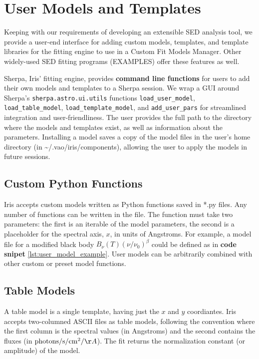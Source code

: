 \section{User Models and Templates}
\label{sec:usermodels}

Keeping with our requirements of developing an extensible SED analysis tool, we provide a user-end interface for adding custom models, templates, and template libraries for the fitting engine to use in a Custom Fit Models Manager. Other widely-used SED fitting programs (EXAMPLES) offer these features as well.

Sherpa, Iris' fitting engine, provides \textbf{command line functions} for users to add their own models and templates to a Sherpa session. We wrap a GUI around Sherpa's \texttt{sherpa.astro.ui.utils} functions \texttt{load\_user\_model}, \texttt{load\_table\_model}, \texttt{load\_template\_model}, and \texttt{add\_user\_pars} for streamlined integration and user-friendliness. The user provides the full path to the directory where the models and templates exist, as well as information about the parameters. Installing a model saves a copy of the model files in the user's home directory (in \~{}/.vao/iris/components), allowing the user to apply the models in future sessions.


\subsection{Custom Python Functions}
Iris accepts custom models written as Python functions saved in *.py files. Any number of functions can be written in the file. The function must take two parameters: the first is an iterable of the model parameters, the second is a placeholder for the spectral axis, $x$, in units of Angstroms. For example, a model file for a modified black body
\(B_{\nu}(T) \left(\nu/\nu_{0}\right)^{\beta}\)
could be defined as in \textbf{code snipet} \ref{lst:user_model_example}. User models can be arbitrarily combined with other custom or preset model functions.

\subsection{Table Models}
A table model is a single template, having just the $x$ and $y$ coordiantes. Iris accepts two-columned ASCII files as table models, following the convention where the first column is the spectral values (in Angstroms) and the second contains the fluxes (in $\mathrm{photons}/\mathrm{s}/\mathrm{cm}^{2}/\AA$). The fit returns the normalization constant (or amplitude) of the model.

